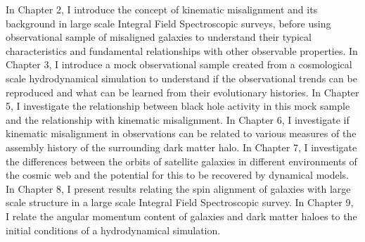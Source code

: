 In Chapter 2, I introduce the concept of kinematic misalignment and its background in large scale Integral Field Spectroscopic surveys, before using observational sample of misaligned galaxies to understand their typical characteristics and fundamental relationships with other observable properties. In Chapter 3, I introduce a mock observational sample created from a cosmological scale hydrodynamical simulation to understand if the observational trends can be reproduced and what can be learned from their evolutionary histories. In Chapter 5, I investigate the relationship between black hole activity in this mock sample and the relationship with kinematic misalignment. In Chapter 6, I investigate if kinematic misalignment in observations can be related to various measures of the assembly history of the surrounding dark matter halo. In Chapter 7, I investigate the differences between the orbits of satellite galaxies in different environments of the cosmic web and the potential for this to be recovered by dynamical models. In Chapter 8, I present results relating the spin alignment of galaxies with large scale structure in a large scale Integral Field Spectroscopic survey. In Chapter 9, I relate the angular momentum content of galaxies and dark matter haloes to the initial conditions of a hydrodynamical simulation.
